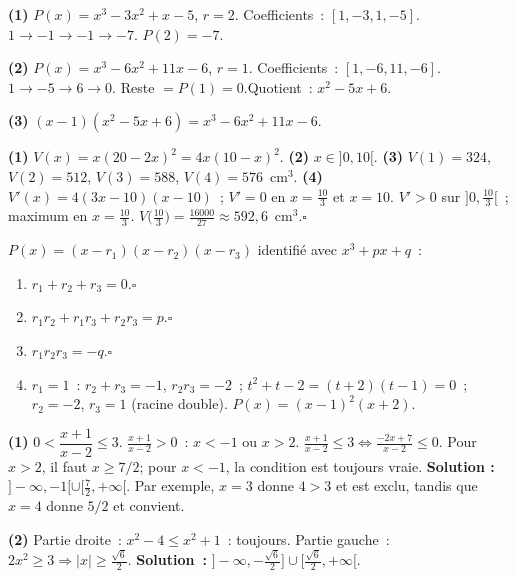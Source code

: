 
\textbf{(1)} $P(x)=x^3-3x^2+x-5$, $r=2$. Coefficients~: $[1,-3,1,-5]$.
$1\to-1\to-1\to-7$. $P(2)=-7$.

\textbf{(2)} $P(x)=x^3-6x^2+11x-6$, $r=1$. Coefficients~: $[1,-6,11,-6]$.
$1\to-5\to6\to0$. Reste $=P(1)=0$.\checkmark\quad Quotient~: $x^2-5x+6$.

\textbf{(3)} $(x-1)(x^2-5x+6)=x^3-6x^2+11x-6$.\checkmark


\textbf{(1)} $V(x)=x(20-2x)^2=4x(10-x)^2$.
\textbf{(2)} $x\in]0,10[$.
\textbf{(3)} $V(1)=324$, $V(2)=512$, $V(3)=588$, $V(4)=576$~cm$^3$.
\textbf{(4)} $V'(x)=4(3x-10)(x-10)$~; $V'=0$ en $x=\tfrac{10}{3}$ et $x=10$.
$V'>0$ sur $]0,\tfrac{10}{3}[$~; maximum en $x=\tfrac{10}{3}$.
$V\!\bigl(\tfrac{10}{3}\bigr)=\tfrac{16000}{27}\approx592{,}6$~cm$^3$.\hfill$\square$


$P(x)=(x-r_1)(x-r_2)(x-r_3)$ identifi\'e avec $x^3+px+q$~:
\begin{enumerate}
  \item $r_1+r_2+r_3=0$.\hfill$\square$
  \item $r_1r_2+r_1r_3+r_2r_3=p$.\hfill$\square$
  \item $r_1r_2r_3=-q$.\hfill$\square$
  \item $r_1=1$~: $r_2+r_3=-1$, $r_2r_3=-2$~;
        $t^2+t-2=(t+2)(t-1)=0$~; $r_2=-2$, $r_3=1$ (racine double).
        $P(x)=(x-1)^2(x+2)$.\checkmark
\end{enumerate}


\textbf{(1)} $0<\dfrac{x+1}{x-2}\leq3$.
$\frac{x+1}{x-2}>0$~: $x<-1$ ou $x>2$.
$\frac{x+1}{x-2}\leq3\Leftrightarrow\frac{-2x+7}{x-2}\leq0$.
Pour $x>2$, il faut $x\geq7/2$; pour $x<-1$, la condition est toujours vraie.
\textbf{Solution :} $]-\infty,-1[\cup[\tfrac72,+\infty[$.
Par exemple, $x=3$ donne $4>3$ et est exclu, tandis que $x=4$ donne $5/2$ et convient.

\textbf{(2)} Partie droite~: $x^2-4\leq x^2+1$~: toujours.
Partie gauche~: $2x^2\geq3\Rightarrow|x|\geq\tfrac{\sqrt{6}}{2}$.
\textbf{Solution~:} $\bigl]-\infty,-\tfrac{\sqrt{6}}{2}\bigr]\cup\bigl[\tfrac{\sqrt{6}}{2},+\infty\bigr[$.


